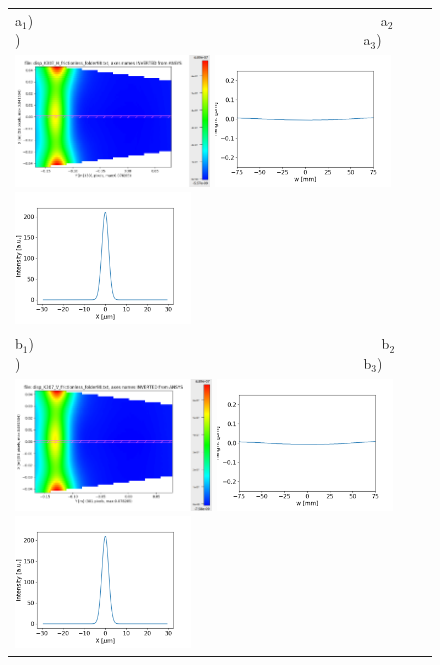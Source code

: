 \documentclass[]{spie}  %
\begin{document}
   \begin{figure} [ht]
  \begin{center}
   \begin{tabular}{l} 
   a$_1$)~~~~~~~~~~~~~~~~~~~~~~~~~~~~~~~~~~~~~~~~~~~~~~~~~
   a$_2$)~~~~~~~~~~~~~~~~~~~~~~~~~~~~~~~~~~~~~~~~~~~~~~~~~a$_3$)\\
   \includegraphics[height=3.5cm]{figures/cryogenic2d.png} 
   \includegraphics[height=3.5cm]{figures/deformationcryogenic1d.png}
   \includegraphics[height=3.5cm]{figures/intensitycryogenic.png} \\

  b$_1$)~~~~~~~~~~~~~~~~~~~~~~~~~~~~~~~~~~~~~~~~~~~~~~~~~
  b$_2$)~~~~~~~~~~~~~~~~~~~~~~~~~~~~~~~~~~~~~~~~~~~~~~~~~b$_3$)\\
  \includegraphics[height=3.5cm]{figures/cryogenic2dKh.png}
  \includegraphics[height=3.5cm]{figures/deformationcryogenic1dKh.png}
  \includegraphics[height=3.5cm]{figures/intensitycryogenicKh.png} \\
   

\end{tabular}
\end{center}
\end{figure}
\end{document}
